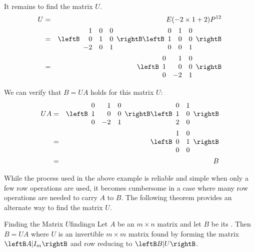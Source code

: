 \begin{solution}
It remains to find the matrix $U$. 
\begin{eqnarray*}
U &=& E(-2 \times 1 + 2) P^{12} \\
&=& \leftB \begin{array}{rrr}
1 & 0 & 0 \\
0 & 1 & 0 \\
-2 & 0 & 1 
\end{array} \rightB
\leftB \begin{array}{rrr}
0 & 1 & 0 \\
1 & 0 & 0 \\
0 & 0 & 1 
\end{array} \rightB \\
&=& \leftB
\begin{array}{rrr}
0 & 1 & 0\\
1 & 0 & 0 \\
0 & -2  & 1 
\end{array}
\rightB
\end{eqnarray*}


We can verify that $B = UA$ holds for this matrix $U$:
\begin{eqnarray*}
UA &=& \leftB
\begin{array}{rrr}
0 & 1 & 0\\
1 & 0 & 0 \\
0 & -2  & 1 
\end{array}
\rightB
\leftB
\begin{array}{rr}
0 & 1 \\
1 & 0 \\
2 & 0
\end{array}
\rightB \\
&=& \leftB \begin{array}{rr}
1 & 0 \\
0 & 1 \\
0 & 0 
\end{array} \rightB \\
&=& B 
\end{eqnarray*} 
\end{solution}

While the process used in the above example is reliable and simple when only a few row operations are used, it becomes cumbersome in a case where many row operations are needed to carry $A$ to $B$. The following theorem provides an alternate way to find the matrix $U$. 

\begin{theorem}{Finding the Matrix $U$}{findingu}
Let $A$ be an $m \times n$ matrix and let $B$ be its \rref. Then $B = UA$ where $U$ is an invertible $m \times m$ matrix found by forming the matrix $ \leftB A | I_m \rightB$ and row reducing to $\leftB B | U \rightB$. 
\end{theorem}

